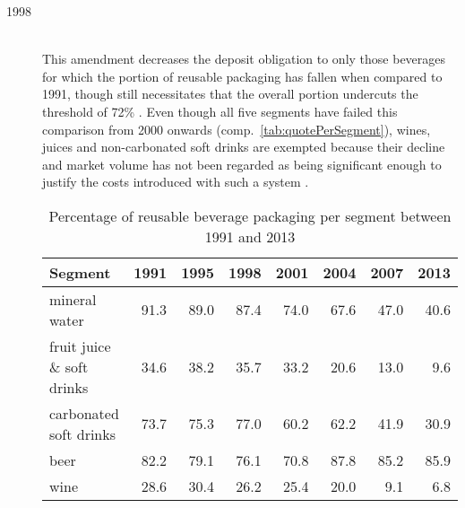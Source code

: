 \begin{description}
	\item[1998]
	\hfill \\
	This amendment decreases the deposit obligation to only those beverages for which the portion of reusable packaging has fallen when compared to 1991, though still necessitates that the overall portion undercuts the threshold of 72\% \cite[pp.~142]{Flanderka1999}. Even though all five segments have failed this comparison from 2000 onwards (comp.~\autoref{tab:quotePerSegment}), wines, juices and non-carbonated soft drinks are exempted because their decline and market volume has not been regarded as being significant enough to justify the costs introduced with such a system  \cite[pp.~6,~9]{Hartlep2011Recycling}. 


\begin{table}[hbt]
	\centering
	\begin{tabular}{l|r|r|r|r|r|r|r}
    Segment & 1991 & 1995 & 1998 & 2001 & 2004 & 2007 & 2013 \\
    \hline
    mineral water & 91.3 & 89.0 & 87.4 & 74.0 & 67.6 & 47.0 & 40.6 \\
    fruit juice \& soft drinks & 34.6 & 38.2 & 35.7 & 33.2 & 20.6 & 13.0 & 9.6 \\
    carbonated soft drinks & 73.7 & 75.3 & 77.0 & 60.2 & 62.2 & 41.9 & 30.9 \\
    beer & 82.2 & 79.1 & 76.1 & 70.8 & 87.8 & 85.2 & 85.9 \\
    wine & 28.6 & 30.4 & 26.2 & 25.4 & 20.0 & 9.1 & 6.8
  	\end{tabular}
  	\caption[Percentage of reusable beverage packaging per segment]{Percentage of reusable beverage packaging per segment between 1991 and 2013 \cite{BMU2015}}
  	\label{tab:quotePerSegment}
\end{table}


\end{description}
